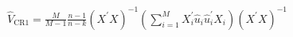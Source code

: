 \documentclass[border=3pt]{standalone}
\begin{document}
$\displaystyle \widehat V_{\mathrm{CR1}}=\frac{M}{M-1}\frac{n-1}{n-k}(X^{\prime}X)^{-1}\!\left(\sum_{i=1}^{M}X_i^{\prime}\widehat u_i\widehat u_i^{\prime}X_i\right)\!(X^{\prime}X)^{-1}$
\end{document}
